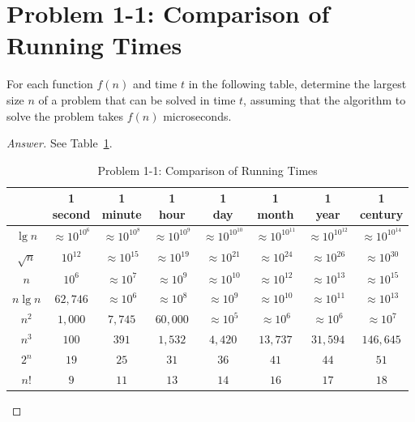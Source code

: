 \documentclass{amsbook}
\theoremstyle{definition}
\theoremstyle{remark}
\numberwithin{section}{chapter}
\numberwithin{equation}{chapter}
\begin{document}
\section{Problem 1-1: Comparison of Running Times}
For each function $f(n)$ and time $t$ in the following table, determine the largest size $n$ of a problem that can be solved in time $t$, assuming that the algorithm to solve the problem takes $f(n)$ microseconds.
\begin{proof}[Answer]
See Table~\ref{Problem 1-1}.

\begin{table}[ht]
\centering
\begin{tabular}{c|c|c|c|c|c|c|c}
                & \makecell{1\\second}
                & \makecell{1\\minute}
                & \makecell{1\\hour}
                & \makecell{1\\day}
                & \makecell{1\\month}
                & \makecell{1\\year}
                & \makecell{1\\century} \\\hline
$\lg n$     
&  $\approx 10^{10^6} $   
& $\approx 10^{10^8} $
& $\approx 10^{10^9} $
& $\approx 10^{10^{10}} $
& $\approx 10^{10^{11}} $
& $\approx 10^{10^{12}} $
& $\approx 10^{10^{14}} $
\\\hline
$\sqrt{n}$ 
& $10^{12}$                    
& $\approx 10^{15}$
& $\approx 10^{19}$
& $\approx 10^{21}$
& $\approx 10^{24}$
& $\approx 10^{26}$
& $\approx 10^{30}$
\\\hline
$n$          
& $10^{6}$                      
&  $\approx 10^7$
&  $\approx 10^9$
&  $\approx 10^{10}$
&  $\approx 10^{12}$
&  $\approx 10^{13}$
&  $\approx 10^{15}$
\\\hline
$n\lg n$   
&  $62,746$ 
&  $\approx 10^6$
&  $\approx 10^8$
&  $\approx 10^9$
&  $\approx 10^{10}$
&  $\approx 10^{11}$
&  $\approx 10^{13}$
\\\hline
$n^2$     
&  $1,000$                       
&  $7,745$        
&  $60,000$
&  $\approx 10^5$
&  $\approx 10^6$
&  $\approx 10^6$
&  $\approx 10^7$
\\\hline
$n^3$      
&  $100$                         
&  $391$        
&  $1,532$
&  $4,420$
&  $13,737$
&  $31,594$
&  $146,645$
\\\hline
$2^n$    
&   $19$                          
&  $25$        
&    $31$    
&   $36$    
&   $41$       
&   $44$
&   $51$
\\\hline
$n!$        
&   $9$                            
&  $11$        
&        $13$
&  $14$     
&  $16$
&  $17$
&  $18$        
\end{tabular}
\caption{Problem 1-1: Comparison of Running Times}
\label{Problem 1-1}
\end{table}
\end{proof}
\end{document}
